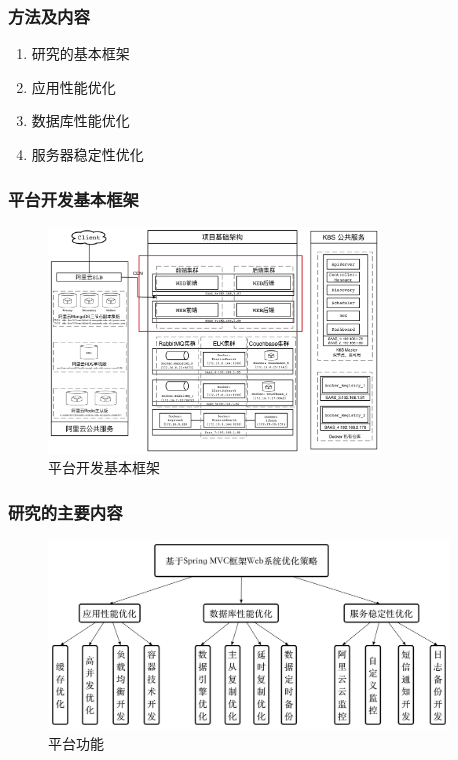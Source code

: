 \documentclass{beamer}
\begin{document}
\begin{frame}
  \frametitle{方法及内容}
  \begin{enumerate}
    \item<1-> 研究的基本框架
    \item<1-> 应用性能优化
    \item<1-> 数据库性能优化
    \item<1-> 服务器稳定性优化
  \end{enumerate}
\end{frame}

\begin{frame}
  \frametitle{平台开发基本框架}
  \begin{figure}
  \centering
    \includegraphics[height=6cm]{./img/02/deploy.png}
    \caption{平台开发基本框架}
    \label{fig:deploy}
  \end{figure}
\end{frame}

\begin{frame}
  \frametitle{研究的主要内容}
  \begin{figure}
  \centering
    \includegraphics[height=5cm]{./img/02/summery.png}
    \caption{平台功能}
    \label{fig:summery}
  \end{figure}
\end{frame}
\end{document}
